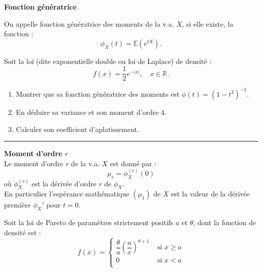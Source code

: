 \documentclass[../PolyS4.tex]{subfiles}
\begin{document}
\begin{Def}{\textbf{Fonction génératrice}}

 On appelle fonction génératrice des moments de la v.a.
$X$, si elle existe, la fonction :
$$\phi_X(t) = \mathbb{E}(e^{tX}).$$
 \end{Def}





Soit la loi (dite exponentielle double ou loi de Laplace) de densité :
$$f(x) = \dfrac{1}{2} e^{-|x|}, \quad x \in \mathbb{R}.$$

\begin{enumerate}
\item Montrer que sa fonction génératrice des moments est $\phi(t) = (1 - t^2)^{-1}$. 
\item En déduire sa variance et son moment d'ordre $4$.
\item Calculer son coefficient d'aplatissement.
\end{enumerate}

\vspace{1em}
\hrule
\vspace{1em}



\begin{Prop}
{\textbf{Moment d'ordre $r$}\\}
 Le moment d'ordre $r$ de la v.a. $X$ est donné par :
$$\mu_r = \phi^{(r)}
_X (0)$$
où $\phi^{(r)}_X$ est la dérivée d'ordre $r$ de $\phi_X$.\\
 En particulier l'espérance mathématique
$(\mu_1)$ de $X$ est la valeur de la dérivée première $\phi_X'$ pour $t = 0$.
\end{Prop}







Soit la loi de Pareto de paramètres strictement positifs $a$ et $\theta$, dont la fonction de densité est :
$$f(x) =
\left\{
\begin{array}{ll}
\dfrac{\theta}{a}\left(\dfrac{a}{x}\right)^{\theta+1}& \text{ si } x \geq a\\
0& \text{ si } x<a\\
\end{array}
\right.$$
\end{document}
